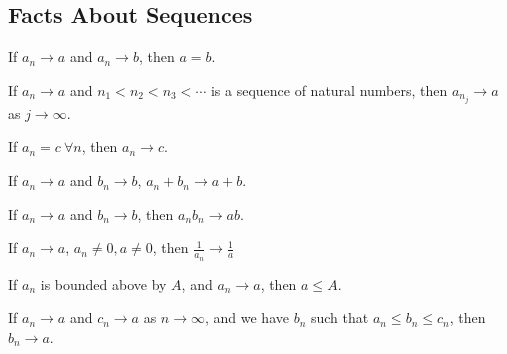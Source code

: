 \documentclass[../Main.tex]{subfiles}
\begin{document}
\subsection{Facts About Sequences}
\begin{propositions}{
        \label{propsSequenceFacts}
    }
    \item If $a_n \rightarrow a$ and $a_n \rightarrow b$, then $a = b$. \label{propSequenceLimitUnique}
    \item If $a_n \rightarrow a$ and $n_1 < n_2 < n_3 < \cdots$ is a sequence of natural numbers, then $a_{n_j} \rightarrow a$ as $j \rightarrow \infty$. \label{propSubsequenceLimit}
    \item If $a_n = c~\forall n$, then $a_n \rightarrow c$.\label{propConstantLimit}
    \item If $a_n \rightarrow a$ and $b_n \rightarrow b$, $a_n + b_n \rightarrow a + b$.\label{propSumOfSequences}
    \item If $a_n \rightarrow a$ and $b_n \rightarrow b$, then $a_n b_n \rightarrow ab$.\label{propProductOfSequences}
    \item If $a_n \rightarrow a$, $a_n \neq 0, a \neq 0$, then $\frac{1}{a_n} \rightarrow \frac{1}{a}$ \label{propReciprocalSequence}
    \item If $a_n$ is bounded above by $A$, and $a_n \rightarrow a$, then $a \leq A$.\label{propBoundedLimit}
    \item If $a_n \rightarrow a$ and $c_n \rightarrow a$ as $n \rightarrow \infty$, and we have $b_n$ such that $a_n \leq b_n \leq c_n$, then $b_n \rightarrow a$. \label{propSequenceSandwich}
\end{propositions}
\end{document}
